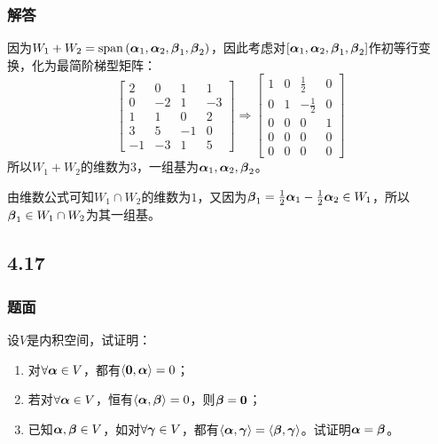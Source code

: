 \documentclass{beamer}
\begin{document}
\begin{frame}
    \frametitle{解答}
    因为\(W_1+W_2=\mathrm{span}\left( \boldsymbol{\alpha}_1,\boldsymbol{\alpha}_2,\boldsymbol{\beta}_1,\boldsymbol{\beta}_2 \right)\)，因此考虑对\(\left[ \boldsymbol{\alpha}_1,\boldsymbol{\alpha}_2,\boldsymbol{\beta}_1,\boldsymbol{\beta}_2 \right]\)作初等行变换，化为最简阶梯型矩阵：
    \begin{equation*}
        \begin{bmatrix}
            2  & 0  & 1  & 1  \\
            0  & -2 & 1  & -3 \\
            1  & 1  & 0  & 2  \\
            3  & 5  & -1 & 0  \\
            -1 & -3 & 1  & 5
        \end{bmatrix}\Rightarrow
        \begin{bmatrix}
            1 & 0 & \frac{1}{2}  & 0 \\
            0 & 1 & -\frac{1}{2} & 0 \\
            0 & 0 & 0            & 1 \\
            0 & 0 & 0            & 0 \\
            0 & 0 & 0            & 0
        \end{bmatrix}
    \end{equation*}
    所以\(W_1+W_2\)的维数为\(3\)，一组基为\(\boldsymbol{\alpha}_1,\boldsymbol{\alpha}_2,\boldsymbol{\beta}_2\)。

    由维数公式可知\(W_1\cap W_2\)的维数为\(1\)，又因为\(\boldsymbol{\beta}_1=\frac{1}{2}\boldsymbol{\alpha}_1-\frac{1}{2}\boldsymbol{\alpha}_2\in W_1\)，所以\(\boldsymbol{\beta}_1\in W_1\cap W_2\)为其一组基。
\end{frame}

\subsection*{4.17}
\begin{frame}
    \frametitle{题面}
    设\(V\)是内积空间，试证明：
    \begin{enumerate}
        \item 对\(\forall\boldsymbol{\alpha}\in V\)，都有\(\left\langle \boldsymbol{0},\boldsymbol{\alpha} \right\rangle=0\)；
        \item 若对\(\forall\boldsymbol{\alpha}\in V\)，恒有\(\left\langle \boldsymbol{\alpha},\boldsymbol{\beta} \right\rangle=0\)，则\(\boldsymbol{\beta}=\boldsymbol{0}\)；
        \item 已知\(\boldsymbol{\alpha},\boldsymbol{\beta}\in V\)，如对\(\forall\boldsymbol{\gamma}\in V\)，都有\(\left\langle \boldsymbol{\alpha},\boldsymbol{\gamma} \right\rangle=\left\langle \boldsymbol{\beta},\boldsymbol{\gamma} \right\rangle\)。试证明\(\boldsymbol{\alpha}=\boldsymbol{\beta}\)。
    \end{enumerate}
\end{frame}
\end{document}
